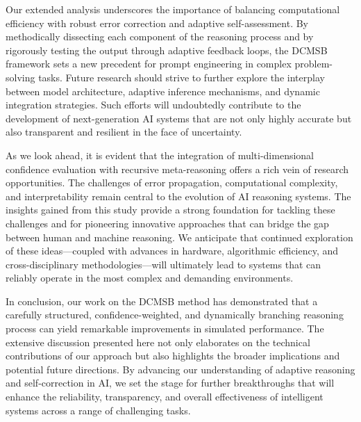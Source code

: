 \documentclass{article}
\begin{document}
Our extended analysis underscores the importance of balancing computational efficiency with robust error correction and adaptive self-assessment. By methodically dissecting each component of the reasoning process and by rigorously testing the output through adaptive feedback loops, the DCMSB framework sets a new precedent for prompt engineering in complex problem-solving tasks. Future research should strive to further explore the interplay between model architecture, adaptive inference mechanisms, and dynamic integration strategies. Such efforts will undoubtedly contribute to the development of next-generation AI systems that are not only highly accurate but also transparent and resilient in the face of uncertainty.

As we look ahead, it is evident that the integration of multi-dimensional confidence evaluation with recursive meta-reasoning offers a rich vein of research opportunities. The challenges of error propagation, computational complexity, and interpretability remain central to the evolution of AI reasoning systems. The insights gained from this study provide a strong foundation for tackling these challenges and for pioneering innovative approaches that can bridge the gap between human and machine reasoning. We anticipate that continued exploration of these ideas—coupled with advances in hardware, algorithmic efficiency, and cross-disciplinary methodologies—will ultimately lead to systems that can reliably operate in the most complex and demanding environments.

In conclusion, our work on the DCMSB method has demonstrated that a carefully structured, confidence-weighted, and dynamically branching reasoning process can yield remarkable improvements in simulated performance. The extensive discussion presented here not only elaborates on the technical contributions of our approach but also highlights the broader implications and potential future directions. By advancing our understanding of adaptive reasoning and self-correction in AI, we set the stage for further breakthroughs that will enhance the reliability, transparency, and overall effectiveness of intelligent systems across a range of challenging tasks.
 
\end{document}
